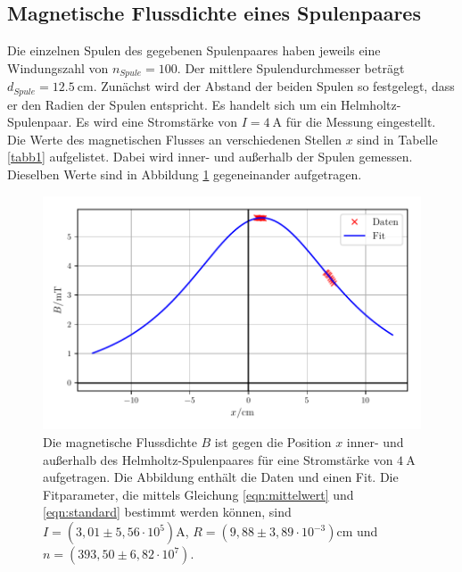 \subsection{Magnetische Flussdichte eines Spulenpaares}
Die einzelnen Spulen des gegebenen Spulenpaares haben jeweils
eine Windungszahl von $n_{Spule} = \num{100}$. Der mittlere
Spulendurchmesser beträgt $d_{Spule} = \SI{12.5}{\centi\meter}$.
\newline
Zunächst wird der Abstand der beiden Spulen so festgelegt, dass
er den Radien der Spulen entspricht. Es handelt sich um ein
Helmholtz-Spulenpaar.
Es wird eine Stromstärke von $I = \SI{4}{\ampere}$ für die
Messung eingestellt.
Die Werte des magnetischen Flusses an verschiedenen Stellen
$x$ sind in Tabelle \ref{tabb1} aufgelistet. Dabei wird inner-
und außerhalb der Spulen gemessen.
Dieselben Werte sind in Abbildung \ref{plotb1} gegeneinander
aufgetragen.


\begin{figure}
    \centering
    \includegraphics{build/plotb1.pdf}
    \caption{Die magnetische Flussdichte $B$ ist gegen die Position $x$ inner-
    und außerhalb des Helmholtz-Spulenpaares für eine Stromstärke von
    $\SI{4}{\ampere}$ aufgetragen. Die Abbildung enthält die Daten und einen Fit.
    Die Fitparameter, die mittels Gleichung \eqref{eqn:mittelwert} und \eqref{eqn:standard}
    bestimmt werden können, sind $I = (3,01 \pm 5,56 \cdot 10^5) \si{\ampere}$, 
    $R = (9,88 \pm 3,89 \cdot 10^{-3}) \si{\centi\meter}$ und $n = (393,50 \pm 6,82 \cdot 10^7)$.}
    \label{plotb1}
\end{figure}

